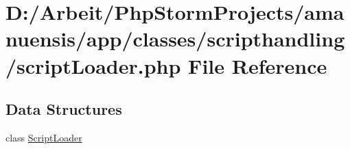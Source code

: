 \hypertarget{script_loader_8php}{}\section{D\+:/\+Arbeit/\+Php\+Storm\+Projects/amanuensis/app/classes/scripthandling/script\+Loader.php File Reference}
\label{script_loader_8php}
\subsection*{Data Structures}
\begin{DoxyCompactItemize}
\item 
class \hyperlink{class_script_loader}{Script\+Loader}
\end{DoxyCompactItemize}
